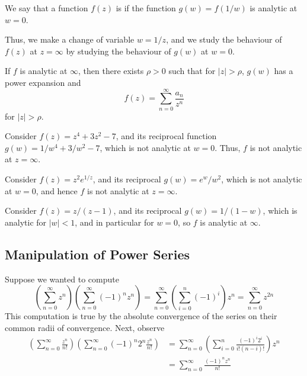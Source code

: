 \documentclass[12pt, a4paper, oneside, openright, titlepage]{book}
\begin{document}
\begin{defn}
    We say that a function $f(z)$ is  if the function $g(w) = f(1/w)$ is analytic at $w = 0$.
\end{defn}

Thus, we make a change of variable $w = 1/z$, and we study the behaviour of $f(z)$ at $z = \infty$ by studying the behaviour of $g(w)$ at $w = 0$.

\begin{thm}
    If $f$ is analytic at $\infty$, then there exists $\rho > 0$ such that for $|z| > \rho$, $g(w)$ has a power expansion and  \begin{equation*}
        f(z) = \sum_{n=0}^{\infty}\frac{a_n}{z^n}
    \end{equation*}
    for $|z| > \rho$.
\end{thm}


\begin{eg}
    Consider $f(z) = z^4 + 3z^2-7$, and its reciprocal function $g(w) = 1/w^4 + 3/w^2 - 7$, which is not analytic at $w = 0$. Thus, $f$ is not analytic at $z = \infty$.
\end{eg}

\begin{eg}
    Consider $f(z) = z^2e^{1/z}$, and its reciprocal $g(w) = e^w/w^2$, which is not analytic at $w = 0$, and hence $f$ is not analytic at $z = \infty$.
\end{eg}

\begin{eg}
    Consider $f(z) = z/(z-1)$, and its reciprocal $g(w) = 1/(1-w)$, which is analytic for $|w| < 1$, and in particular for $w = 0$, so $f$ is analytic at $\infty$. 
\end{eg}


\subsection{Manipulation of Power Series}

\begin{eg}
    Suppose we wanted to compute $$\left(\sum_{n=0}^{\infty}z^n\right)\left(\sum_{n=0}^{\infty}(-1)^nz^n\right) = \sum_{n=0}^{\infty}\left(\sum_{i=0}^n(-1)^i\right)z^n = \sum_{n=0}^{\infty}z^{2n}$$
    This computation is true by the absolute convergence of the series on their common radii of convergence. Next, observe \begin{align*}
        \left(\sum_{n=0}^{\infty}\frac{z^n}{n!}\right)\left(\sum_{n=0}^{\infty}(-1)^n2^n\frac{z^n}{n!}\right) &= \sum_{n=0}^{\infty}\left(\sum_{i=0}^n\frac{(-1)^i2^i}{i!(n-i)!}\right)z^n \\
        &= \sum_{n=0}^{\infty}\frac{(-1)^nz^n}{n!}
    \end{align*}
\end{eg}
\end{document}
